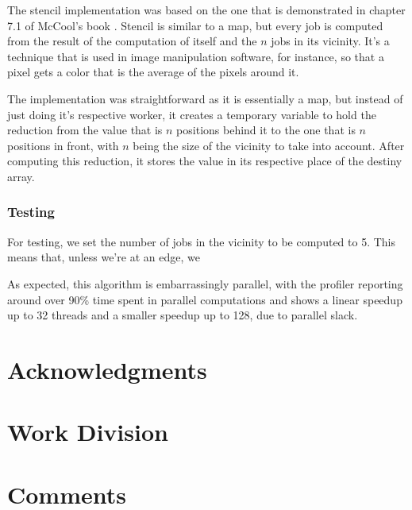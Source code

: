\documentclass[9pt,journal]{IEEEtran}
\begin{document}
The stencil implementation was based on the one that is demonstrated in chapter 7.1 of McCool's book \cite{mccool}. Stencil is similar to a map, but every job is computed from the result of the computation of itself and the $ n $ jobs in its vicinity. It's a technique that is used in image manipulation software, for instance, so that a pixel gets a color that is the average of the pixels around it.

The implementation was straightforward as it is essentially a map, but instead of just doing it's respective worker, it creates a temporary variable to hold the reduction from the value that is $ n $ positions behind it to the one that is $ n $ positions in front, with $ n $ being the size of the vicinity to take into account. After computing this reduction, it stores the value in its respective place of the destiny array.


\subsubsection{Testing}

For testing, we set the number of jobs in the vicinity to be computed to 5. This means that, unless we're at an edge, we

As expected, this algorithm is embarrassingly parallel, with the profiler reporting around over 90\% time spent in parallel computations and shows a linear speedup up to 32 threads and a smaller speedup up to 128, due to parallel slack.

\section{Acknowledgments}


{}

\section{Work Division}

\section{Comments}
\end{document}
